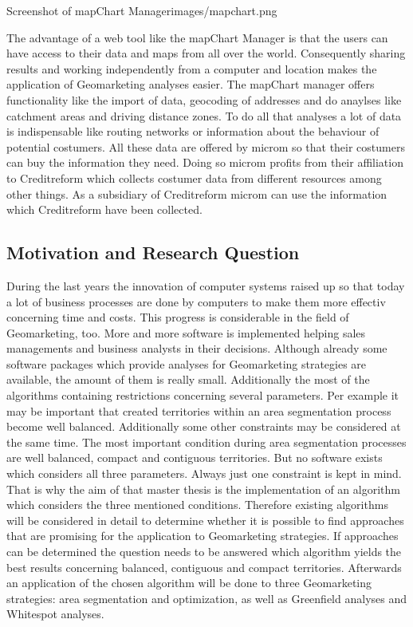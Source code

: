 \begin{figureOwn}{Screenshot of mapChart Manager}{images/mapchart.png}\end{figureOwn}

The advantage of a web tool like the mapChart Manager is that the users can have access to their data and maps from all over the world. Consequently sharing results and working independently from a computer and location makes the application of Geomarketing analyses easier. The mapChart manager offers functionality like the import of data, geocoding of addresses and do anaylses like catchment areas and driving distance zones. To do all that analyses a lot of data is indispensable  like routing networks or information about the behaviour of potential costumers. All these data are offered by microm so that their costumers can buy the information they need. Doing so microm profits from their affiliation to Creditreform which collects costumer data from different resources among other things. As a subsidiary of Creditreform microm can use the information which Creditreform have been collected.

\subsection{Motivation and Research Question}
During the last years the innovation of computer systems raised up so that today a lot of business processes are done by computers to make them more effectiv concerning time and costs. This progress is considerable in the field of Geomarketing, too. More and more software is implemented helping sales managements and business analysts in their decisions. Although already some software packages which provide analyses for Geomarketing strategies are available, the amount of them is really small. Additionally the most of the algorithms containing restrictions concerning several parameters. Per example it may be important that created territories within an area segmentation process become well balanced. Additionally some other constraints may be considered at the same time. The most important condition during area segmentation processes are well balanced, compact and contiguous territories. But no software exists which considers all three parameters. Always just one constraint is kept in mind. That is why the aim of that master thesis is the implementation of an algorithm which considers the three mentioned conditions. Therefore existing algorithms will be considered in detail to determine whether it is possible to find approaches that are promising for the application to Geomarketing strategies. If approaches can be determined the question needs to be answered which algorithm yields the best results concerning balanced, contiguous and compact territories. Afterwards an application of the chosen algorithm will be done to three Geomarketing strategies: area segmentation and optimization, as well as Greenfield analyses and Whitespot analyses.

